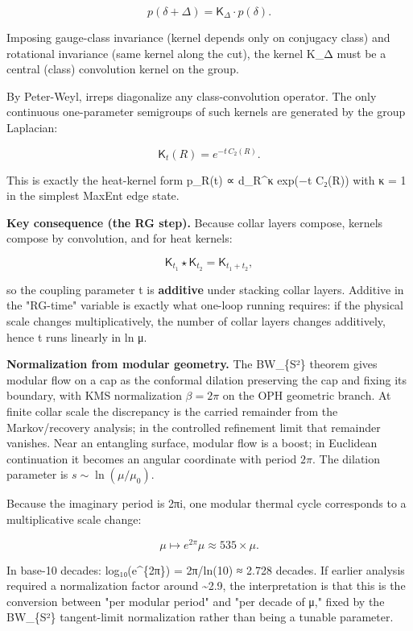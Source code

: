 \[
p(\delta + \Delta) = \mathsf{K}_\Delta \cdot p(\delta).
\]

Imposing gauge-class invariance (kernel depends only on conjugacy class) and rotational invariance (same kernel along the cut), the kernel K\_Δ must be a central (class) convolution kernel on the group.

By Peter-Weyl, irreps diagonalize any class-convolution operator. The only continuous one-parameter semigroups of such kernels are generated by the group Laplacian:

\[
\mathsf{K}_t(R) = e^{-t \, C_2(R)}.
\]

This is exactly the heat-kernel form p\_R(t) ∝ d\_R\^{}κ exp(−t C₂(R)) with κ = 1 in the simplest MaxEnt edge state.

\textbf{Key consequence (the RG step).} Because collar layers compose, kernels compose by convolution, and for heat kernels:

\[
\mathsf{K}_{t_1} \star \mathsf{K}_{t_2} = \mathsf{K}_{t_1 + t_2},
\]

so the coupling parameter t is \textbf{additive} under stacking collar layers. Additive in the "RG-time" variable is exactly what one-loop running requires: if the physical scale changes multiplicatively, the number of collar layers changes additively, hence t runs linearly in ln μ.

\textbf{Normalization from modular geometry.} The BW\_\{S²\} theorem gives modular flow on a cap as the conformal dilation preserving the cap and fixing its boundary, with KMS normalization \(\beta=2\pi\) on the OPH geometric branch. At finite collar scale the discrepancy is the carried remainder from the Markov/recovery analysis; in the controlled refinement limit that remainder vanishes. Near an entangling surface, modular flow is a boost; in Euclidean continuation it becomes an angular coordinate with period \(2\pi\). The dilation parameter is \(s\sim \ln(\mu/\mu_0)\).

Because the imaginary period is 2πi, one modular thermal cycle corresponds to a multiplicative scale change:

\[
\mu \mapsto e^{2\pi} \mu \approx 535 \times \mu.
\]

In base-10 decades: log₁₀(e\^{}\{2π\}) = 2π/ln(10) ≈ 2.728 decades. If earlier analysis required a normalization factor around \textasciitilde2.9, the interpretation is that this is the conversion between "per modular period" and "per decade of μ," fixed by the BW\_\{S²\} tangent-limit normalization rather than being a tunable parameter.

